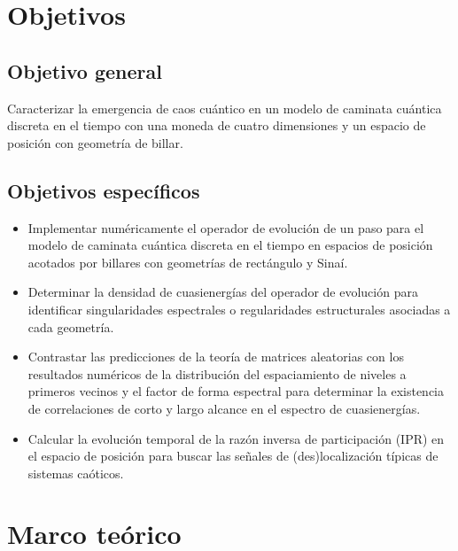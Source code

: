 \documentclass[11pt,a4paper]{article}  %
\begin{document}
\section{Objetivos}  %

\subsection{Objetivo general}
Caracterizar la emergencia de caos cuántico en un modelo de caminata cuántica discreta en el tiempo con una moneda de cuatro dimensiones y un espacio de posición con geometría de billar. 

\subsection{Objetivos específicos}
\begin{itemize}
    \item Implementar numéricamente el operador de evolución de un paso para el modelo de caminata cuántica discreta en el tiempo en espacios de posición acotados por billares con geometrías de rectángulo y Sinaí.
    \item Determinar la densidad de cuasienergías del operador de evolución para identificar singularidades espectrales o regularidades estructurales asociadas a cada geometría.
    \item Contrastar las predicciones de la teoría de matrices aleatorias con los resultados numéricos de la distribución del espaciamiento de niveles a primeros vecinos y el factor de forma espectral para determinar la existencia de correlaciones de corto y largo alcance en el espectro de cuasienergías.
    \item Calcular la evolución temporal de la razón inversa de participación (IPR) en el espacio de posición para buscar las señales de (des)localización típicas de sistemas caóticos. 
\end{itemize}
\section{Marco teórico}  %
\end{document}
